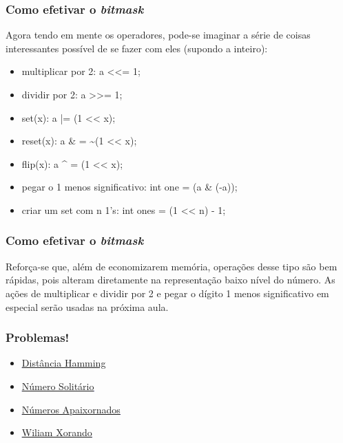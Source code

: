 \documentclass{beamer}
\begin{document}
	\begin{frame}
	\frametitle{Como efetivar o \textit{bitmask}}
	Agora tendo em mente os operadores, pode-se imaginar a série de coisas interessantes
	possível de se fazer com eles (supondo a inteiro):

	\begin{itemize}
		\item multiplicar por 2: a <<= 1;
		\item dividir por 2: a >>= 1;
		\item set(x): a |= (1 << x);
		\item reset(x): a \& = \~{}(1 << x);
		\item flip(x): a \^{} = (1 << x);
		\item pegar o 1 menos significativo: int one = (a \& (-a));
		\item criar um set com n 1's: int ones = (1 << n) - 1;
	\end{itemize}
	\end{frame}

	\begin{frame}
	\frametitle{Como efetivar o \textit{bitmask}}
	Reforça-se que, além de economizarem memória, operações desse tipo são bem rápidas,
	pois alteram diretamente na representação baixo nível do número. As ações de
	multiplicar e dividir por 2 e pegar o dígito 1 menos significativo em especial serão
	usadas na próxima aula.
	\end{frame}

	\begin{frame}
	\frametitle{Problemas!}
	\begin{itemize}
	\item \textcolor{blue}{\underline{\href{https://www.urionlinejudge.com.br/judge/pt/problems/view/2289}{Distância Hamming}}}
	\item \textcolor{blue}{\underline{\href{https://www.urionlinejudge.com.br/judge/pt/problems/view/2091}{Número Solitário}}}
	\item \textcolor{blue}{\underline{\href{https://www.urionlinejudge.com.br/judge/pt/problems/view/2290}{Números Apaixornados}}}
	\item \textcolor{blue}{\underline{\href{https://www.urionlinejudge.com.br/judge/pt/problems/view/2500}{Wiliam Xorando}}}
	\end{itemize}
	\end{frame}
\end{document}
